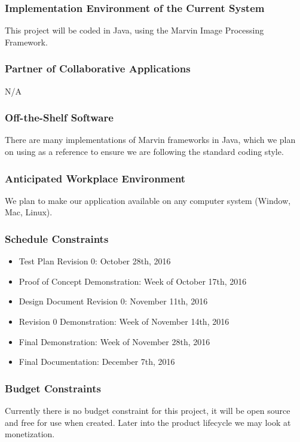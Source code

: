 \documentclass[12pt, titlepage]{article}
\begin{document}
\subsubsection{Implementation Environment of the Current System}

This project will be coded in Java, using the Marvin Image Processing Framework.

\subsubsection{Partner of Collaborative Applications}

N/A

\subsubsection{Off-the-Shelf Software}

There are many implementations of Marvin frameworks in Java, which we plan on using as a reference to ensure we are following the standard coding style.

\subsubsection{Anticipated Workplace Environment}

We plan to make our application available on any computer system (Window, Mac, Linux).

\subsubsection{Schedule Constraints}

\begin{itemize}
  \item Test Plan Revision 0: October 28th, 2016
  \item Proof of Concept Demonstration: Week of October 17th, 2016
  \item Design Document Revision 0: November 11th, 2016
  \item Revision 0 Demonstration: Week of November 14th, 2016
  \item Final Demonstration: Week of November 28th, 2016
  \item Final Documentation: December 7th, 2016
\end{itemize}

\subsubsection{Budget Constraints}
Currently there is no budget constraint for this project, it will be open source and free for use when created. Later into the product lifecycle we may look at monetization.
\end{document}
